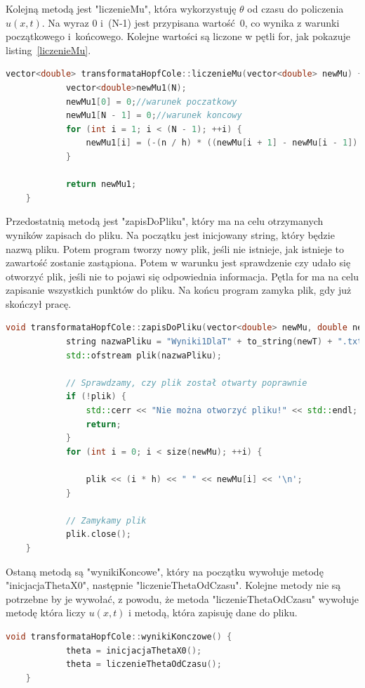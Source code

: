 \documentclass[a4paper,12pt]{article}
\begin{document}
	Kolejną metodą jest "liczenieMu", która wykorzystuję $\theta$ od czasu do policzenia $u(x,t)$. Na wyraz 0 i~(N-1) jest przypisana wartość~0, co wynika z warunki początkowego i~końcowego. Kolejne wartości są liczone w pętli for, jak pokazuje listing~\ref{liczenieMu}. 
	\begin{lstlisting}[caption={ciało metody liczenieMu},label={liczenieMu}, language=C++]
		vector<double> transformataHopfCole::liczenieMu(vector<double> newMu) {
			vector<double>newMu1(N);
			newMu1[0] = 0;//warunek poczatkowy
			newMu1[N - 1] = 0;//warunek koncowy
			for (int i = 1; i < (N - 1); ++i) {
				newMu1[i] = (-(n / h) * ((newMu[i + 1] - newMu[i - 1]) / newMu[i]));
			}
			
			return newMu1;
	}\end{lstlisting}
	Przedostatnią metodą jest "zapisDoPliku", który ma na celu otrzymanych wyników zapisach do pliku. Na początku jest inicjowany string, który będzie nazwą pliku. Potem program tworzy nowy plik, jeśli nie istnieje, jak istnieje to zawartość zostanie zastąpiona. Potem w warunku jest sprawdzenie czy udało się otworzyć plik, jeśli nie to pojawi się odpowiednia informacja. Pętla for ma na celu zapisanie wszystkich punktów do pliku. Na końcu program zamyka plik, gdy już skończył pracę.
	\begin{lstlisting}[caption={metoda zapisDoPliku},label={ZapisDoPliku}, language=C++]
		void transformataHopfCole::zapisDoPliku(vector<double> newMu, double newT) {
			string nazwaPliku = "Wyniki1DlaT" + to_string(newT) + ".txt";
			std::ofstream plik(nazwaPliku);
			
			// Sprawdzamy, czy plik został otwarty poprawnie
			if (!plik) {
				std::cerr << "Nie można otworzyć pliku!" << std::endl;
				return;
			}
			for (int i = 0; i < size(newMu); ++i) {
				
				plik << (i * h) << " " << newMu[i] << '\n';
			}
			
			// Zamykamy plik
			plik.close();
	}\end{lstlisting}
	Ostaną metodą są "wynikiKoncowe", który na początku wywołuje metodę "inicjacjaThetaX0", następnie "liczenieThetaOdCzasu". Kolejne metody nie są potrzebne by je wywołać, z powodu, że metoda "liczenieThetaOdCzasu" wywołuje metodę która liczy $u(x,t)$ i metodą, która zapisuję dane do pliku. 
	\begin{lstlisting}[caption={metoda wynikiKonczowe},label={wynikiKonczowe}, language=C++]
		void transformataHopfCole::wynikiKonczowe() {
			theta = inicjacjaThetaX0();
			theta = liczenieThetaOdCzasu();
	}\end{lstlisting}
\end{document}
